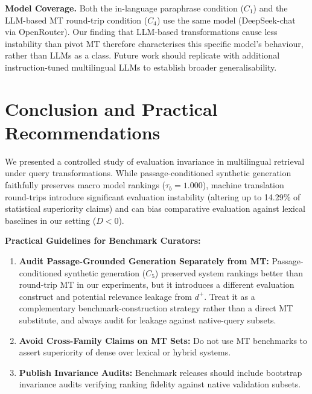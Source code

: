 \documentclass[runningheads]{llncs}
\begin{document}
\noindent\textbf{Model Coverage.} Both the in-language paraphrase condition ($C_1$) and the LLM-based MT round-trip condition ($C_4$) use the same model (DeepSeek-chat via OpenRouter). Our finding that LLM-based transformations cause less instability than pivot MT therefore characterises this specific model's behaviour, rather than LLMs as a class. Future work should replicate with additional instruction-tuned multilingual LLMs to establish broader generalisability.

\section{Conclusion and Practical Recommendations}
\label{sec:conclusion}
We presented a controlled study of evaluation invariance in multilingual retrieval under query transformations. While passage-conditioned synthetic generation faithfully preserves macro model rankings ($\tau_b = 1.000$), machine translation round-trips introduce significant evaluation instability (altering up to 14.29\% of statistical superiority claims) and can bias comparative evaluation against lexical baselines in our setting ($D < 0$).

\noindent\textbf{Practical Guidelines for Benchmark Curators:}
\begin{enumerate}
    \item \textbf{Audit Passage-Grounded Generation Separately from MT:} Passage-conditioned synthetic generation ($C_5$) preserved system rankings better than round-trip MT in our experiments, but it introduces a different evaluation construct and potential relevance leakage from $d^+$. Treat it as a complementary benchmark-construction strategy rather than a direct MT substitute, and always audit for leakage against native-query subsets.
    \item \textbf{Avoid Cross-Family Claims on MT Sets:} Do not use MT benchmarks to assert superiority of dense over lexical or hybrid systems.
    \item \textbf{Publish Invariance Audits:} Benchmark releases should include bootstrap invariance audits verifying ranking fidelity against native validation subsets.
\end{enumerate}
\end{document}
